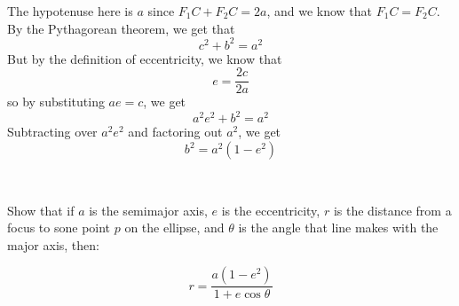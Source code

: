 \documentclass{article}
\begin{document}
\begin{customproof}

The hypotenuse here is $a$ since $F_1C + F_2C = 2a$, and we know that $F_1C = F_2C$. By the Pythagorean theorem, we get that $$c^2 + b^2 = a^2$$But by the definition of eccentricity, we know that $$e = \frac{2c}{2a}$$so by substituting $ae = c$, we get $$a^2e^2 + b^2 = a^2$$Subtracting over $a^2e^2$ and factoring out $a^2$, we get $$b^2 = a^2(1-e^2)$$
\end{customproof}

\begin{theorem}
\

Show that if $a$ is the semimajor axis, $e$ is the eccentricity, $r$ is the distance from a focus to sone point $p$ on the ellipse, and $\theta$ is the angle that line makes with the major axis, then:

$$r = \frac{a(1-e^2)}{1+e\cos\theta}$$
\end{theorem}
\end{document}
